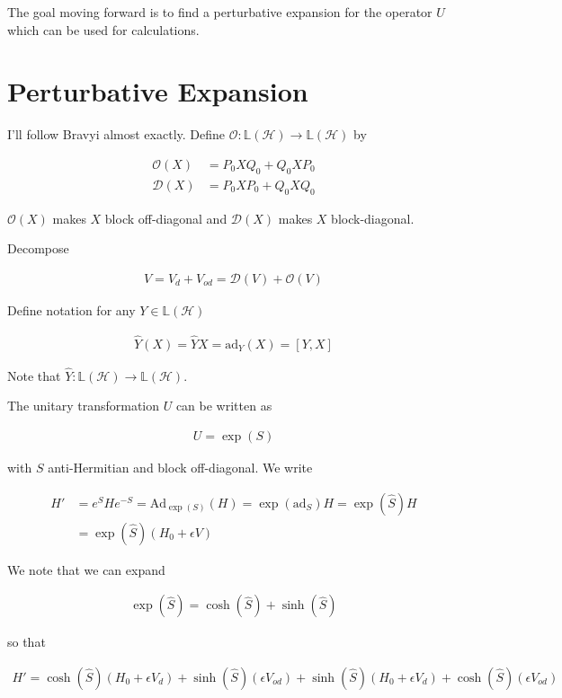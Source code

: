 \documentclass[12pt]{article}
\begin{document}
The goal moving forward is to find a perturbative expansion for the operator $U$ which can be used for calculations.

\section{Perturbative Expansion}

I'll follow Bravyi almost exactly. Define $\mathcal{O}:\mathbb{L}(\mathcal{H}) \rightarrow \mathbb{L}(\mathcal{H})$ by 

\begin{align}
\mathcal{O}(X) &= P_0 X Q_0 + Q_0 X P_0\\
\mathcal{D}(X) &= P_0 X P_0 + Q_0 X Q_0
\end{align}

$\mathcal{O}(X)$ makes $X$ block off-diagonal and $\mathcal{D}(X)$ makes $X$ block-diagonal.

Decompose 

\begin{align}
V = V_d + V_{od} = \mathcal{D}(V) + \mathcal{O}(V)
\end{align}

Define notation for any $Y \in \mathbb{L}(\mathcal{H})$

\begin{align}
\hat{Y}(X) = \hat{Y}X = \text{ad}_Y(X) = [Y,X]
\end{align}

Note that $\hat{Y}:\mathbb{L}(\mathcal{H})\rightarrow\mathbb{L}(\mathcal{H})$.

The unitary transformation $U$ can be written as

\begin{align}
U = \exp(S)
\end{align}

with $S$ anti-Hermitian and block off-diagonal. We write

\begin{align}
H' &= e^S H e^{-S} = \text{Ad}_{\exp(S)}(H) = \exp(\text{ad}_S) H = \exp(\hat{S})H\\
&= \exp(\hat{S}) (H_0 + \epsilon V)
\end{align}

We note that we can expand

\begin{align}
\exp(\hat{S}) = \cosh(\hat{S}) + \sinh(\hat{S})
\end{align}

so that

\begin{align}
H' = \cosh(\hat{S})(H_0 + \epsilon V_d) + \sinh(\hat{S})(\epsilon V_{od}) + \sinh(\hat{S})(H_0+ \epsilon V_d) + \cosh(\hat{S})(\epsilon V_{od})
\end{align}
\end{document}
